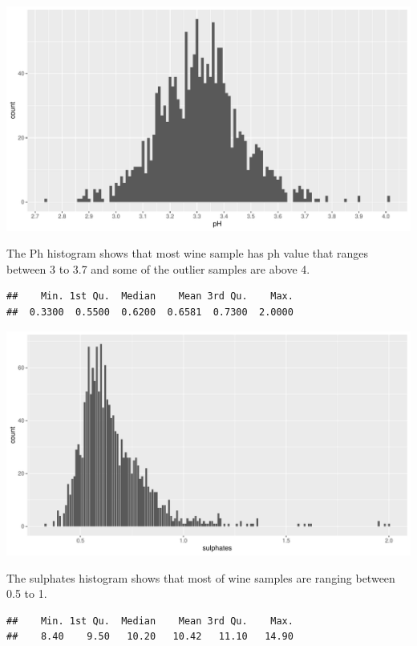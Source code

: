 \documentclass[]{article}
\begin{document}
\begin{center}\includegraphics{Figs/unnamed-chunk-9-1} \end{center}

The Ph histogram shows that most wine sample has ph value that ranges
between 3 to 3.7 and some of the outlier samples are above 4.

\begin{verbatim}
##    Min. 1st Qu.  Median    Mean 3rd Qu.    Max. 
##  0.3300  0.5500  0.6200  0.6581  0.7300  2.0000
\end{verbatim}

\begin{center}\includegraphics{Figs/unnamed-chunk-10-1} \end{center}

The sulphates histogram shows that most of wine samples are ranging
between 0.5 to 1.

\begin{verbatim}
##    Min. 1st Qu.  Median    Mean 3rd Qu.    Max. 
##    8.40    9.50   10.20   10.42   11.10   14.90
\end{verbatim}
\end{document}
